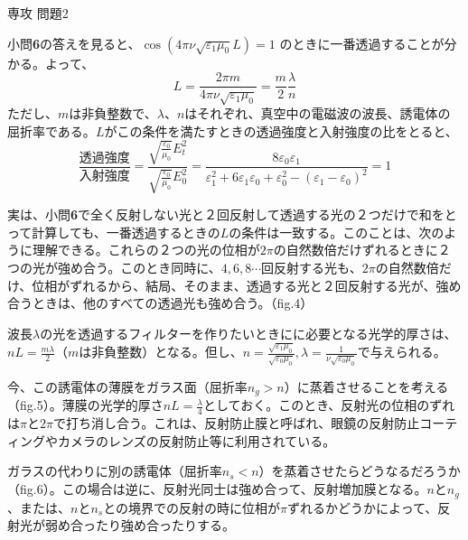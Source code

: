 \documentclass[fleqn]{jbook}
\begin{document}
\begin{answer}{専攻 問題2}{}
\begin{subanswers}
\SubAnswer
小問{\bf 6}の答えを見ると、$ \cos(4\pi\nu\sqrt{\varepsilon_1\mu_0}L)=1$
のときに一番透過することが分かる。よって、
\[  L=\frac{2\pi m}{4\pi\nu\sqrt{\varepsilon_1\mu_0}}=\frac{m}{2}\frac{\lambda}{n}\]
ただし、$m$は非負整数で、$\lambda$、$n$はそれぞれ、真空中の電磁波の波長、誘電体の屈折率である。$L$がこの条件を満たすときの透過強度と入射強度の比をとると、
\[
 \frac{透過強度}{入射強度} = \frac{\sqrt{\frac{\varepsilon_0}{\mu_0}}E_t^2}{\sqrt{\frac{\varepsilon_0}{\mu_0}}E_0^2} 
                           = \frac{8\varepsilon_0\varepsilon_1}{\varepsilon_1^2+6\varepsilon_1\varepsilon_0+\varepsilon_0^2-(\varepsilon_1-\varepsilon_0)^2}  
                           = 1
\]

実は、小問{\bf{6}}で全く反射しない光と２回反射して透過する光の２つだけで和をとって計算しても、一番透過するときの$L$の条件は一致する。このことは、次のように理解できる。これらの２つの光の位相が$2\pi$の自然数倍だけずれるときに２つの光が強め合う。このとき同時に、$4,6,8\cdots$回反射する光も、$2\pi$の自然数倍だけ、位相がずれるから、結局、そのまま、透過する光と２回反射する光が、強め合うときは、他のすべての透過光も強め合う。（fig.4）

 波長$\lambda$の光を透過するフィルターを作りたいときにに必要となる光学的厚さは、$nL=\frac{m\lambda}{2}$（$m$は非負整数）となる。但し、$n=\frac{\sqrt{\varepsilon_1\mu_0}}{\sqrt{\varepsilon_0\mu_0}} , \lambda=\frac{1}{\nu \sqrt{\varepsilon_0 \mu_0}}$で与えられる。

今、この誘電体の薄膜をガラス面（屈折率$n_g>n$）に蒸着させることを考える（fig.5）。薄膜の光学的厚さ$nL=\frac{\lambda}{4}$としておく。このとき、反射光の位相のずれは$\pi$と$2\pi$で打ち消し合う。これは、反射防止膜と呼ばれ、眼鏡の反射防止コーティングやカメラのレンズの反射防止等に利用されている。

ガラスの代わりに別の誘電体（屈折率$n_s<n$）を蒸着させたらどうなるだろうか（fig.6）。この場合は逆に、反射光同士は強め合って、反射増加膜となる。$n$と$n_g$、または、$n$と$n_s$との境界での反射の時に位相が$\pi$ずれるかどうかによって、反射光が弱め合ったり強め合ったりする。


\end{subanswers}
\end{answer}
\end{document}
